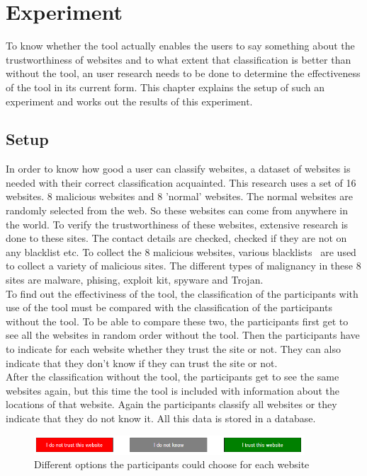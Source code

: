 \documentclass[twoside,openright,notitlepage]{uva-bachelor-thesis}
\begin{document}
\FloatBarrier
\chapter{Experiment}
To know whether the tool actually enables the users to say something about the trustworthiness of websites and to what extent that classification is better than without the tool, an user research needs to be done to determine the effectiveness of the tool in its current form. This chapter explains the setup of such an experiment and works out the results of this experiment.

\section{Setup}
In order to know how good a user can classify websites, a dataset of websites is needed with their correct classification acquainted. This research uses a set of 16 websites. 8 malicious websites and 8 'normal' websites. The normal websites are randomly selected from the web. So these websites can come from anywhere in the world. To verify the trustworthiness of these websites, extensive research is done to these sites. The contact details are checked, checked if they are not on any blacklist etc. To collect the 8 malicious websites, various blacklists~\cite{malwareblacklist, phishtank, wot} are used to collect a variety of malicious sites. The different types of malignancy in these 8 sites are malware, phising, exploit kit, spyware and Trojan.\\

To find out the effectiviness of the tool, the classification of the participants with use of the tool must be compared with the classification of the participants without the tool. To be able to compare these two, the participants first get to see all the websites in random order without the tool. Then the participants have to indicate for each website whether they trust the site or not. They can also indicate that they don't know if they can trust the site or not. \\ 

After the classification without the tool, the participants get to see the same websites again, but this time the tool is included with information about the locations of that website. Again the participants classify all websites or they indicate that they do not know it. All this data is stored in a database.

\begin{figure}[h!]
    \centering
    \includegraphics[width=0.9\textwidth, center]{img/options.PNG}
    \caption{Different options the participants could choose for each website}
    \label{fig:options}
\end{figure}
\end{document}
